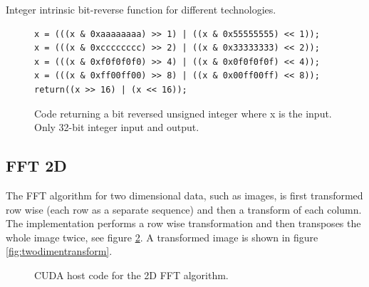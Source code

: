 \begin{table}[h!]
	\centering
	
	\caption{Integer intrinsic bit-reverse function for different technologies.}
	\label{tab:bit-reverse-intrinsics}
\end{table}

\begin{figure}[h]
	\centering
	\lstset{language=C++}
	\begin{framed}
	\begin{lstlisting}
x = (((x & 0xaaaaaaaa) >> 1) | ((x & 0x55555555) << 1));
x = (((x & 0xcccccccc) >> 2) | ((x & 0x33333333) << 2));
x = (((x & 0xf0f0f0f0) >> 4) | ((x & 0x0f0f0f0f) << 4));
x = (((x & 0xff00ff00) >> 8) | ((x & 0x00ff00ff) << 8));
return((x >> 16) | (x << 16));
	\end{lstlisting}
	\end{framed}
	\caption{ Code returning a bit reversed unsigned integer where x is the input. Only 32-bit integer input and output. }
	\label{fig:code-bit-reverse}
\end{figure}

\subsection{FFT 2D}

The FFT algorithm for two dimensional data, such as images, is first transformed row wise (each row as a separate sequence) and then a transform of each column. The implementation performs a row wise transformation and then transposes the whole image twice, see figure \ref{lst:cuda:host-2d-example}. A transformed image is shown in figure \ref{fig:twodimentransform}.

\begin{figure}[!h]
	\centering
	\begin{framed}
			
	\end{framed}
	\caption{CUDA host code for the 2D FFT algorithm.}
	\label{lst:cuda:host-2d-example}	
\end{figure}

